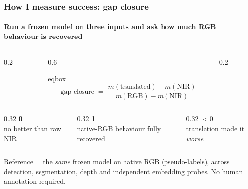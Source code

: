 \documentclass[
	aspectratio=169,
	t,
	onlytextwidth,
	10pt,
]{beamer}
\newcommand{\up}[1]{\textcolor{GoodGreen}{#1}}
\newcommand{\dn}[1]{\textcolor{BadRed}{#1}}
\begin{document}

\begin{frame}
	\frametitle{How I measure success: gap closure}
	\framesubtitle{Run a frozen model on three inputs and ask how much RGB behaviour is recovered}

	\centering
	\vspace{1.2\baselineskip}
	\begin{columns}
		\begin{column}{0.2\linewidth}\end{column}
		\begin{column}{0.6\linewidth}
			\begin{beamercolorbox}[wd=\linewidth, sep=10pt, rounded=true]{eqbox}
				\centering
				\[
					\text{gap closure} \;=\; \frac{m(\text{translated}) - m(\text{NIR})}{m(\text{RGB}) - m(\text{NIR})}
				\]
			\end{beamercolorbox}
		\end{column}
		\begin{column}{0.2\linewidth}\end{column}
	\end{columns}

	\vspace{1.0\baselineskip}
	\begin{columns}[T]
		\begin{column}{0.32\linewidth}
			\centering\textbf{\dn{0}}\\ no better than raw NIR
		\end{column}
		\begin{column}{0.32\linewidth}
			\centering\textbf{\up{1}}\\ native-RGB behaviour fully recovered
		\end{column}
		\begin{column}{0.32\linewidth}
			\centering\textbf{\dn{$<0$}}\\ translation made it \emph{worse}
		\end{column}
	\end{columns}

	\vspace{0.7\baselineskip}
	{\small Reference = the \emph{same} frozen model on native RGB (pseudo-labels), across detection, segmentation, depth and independent embedding probes. No human annotation required.}
\end{frame}
\end{document}
